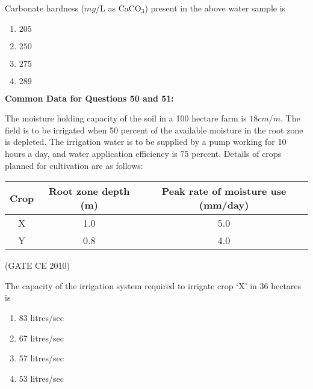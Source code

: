     
    \item Carbonate hardness ($mg$/L as CaCO$_3$) present in the above water sample is

    \begin{multicols}{4}
        \begin{enumerate}
            \item $205$
            \item $250$
            \item $275$
            \item $289$
        \end{enumerate}
    \end{multicols}

     \textbf{Common Data for Questions 50 and 51:}

    
    The moisture holding capacity of the soil in a 100 hectare farm is $18 cm$/$m$. The field is to be irrigated when 50 percent of the available moisture in the root zone is depleted. The irrigation water is to be supplied by a pump working for 10 hours a day, and water application efficiency is 75 percent. Details of crops planned for cultivation are as follows:

    \begin{table}[h!]
        \centering
        \begin{tabular}{|c|c|c|}
            \hline
            \textbf{Crop} & \textbf{Root zone depth (m)} & \textbf{Peak rate of moisture use (mm/day)} \\ \hline
            X & 1.0 & 5.0 \\ \hline
            Y & 0.8 & 4.0 \\ \hline
        \end{tabular}
    \end{table} \hfill (GATE CE 2010)

    
    \item The capacity of the irrigation system required to irrigate crop `X' in 36 hectares is

    \begin{multicols}{4}
        \begin{enumerate}
            \item 83 litres/sec
            \item 67 litres/sec
            \item 57 litres/sec
            \item 53 litres/sec
        \end{enumerate}
    \end{multicols}

